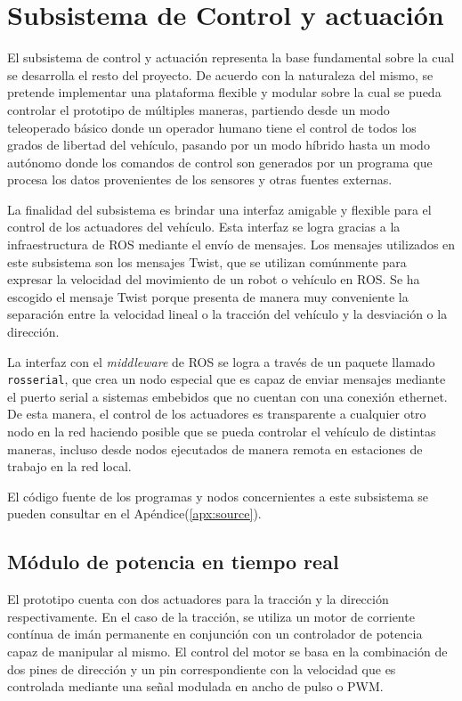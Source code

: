 \section{Subsistema de Control y actuación}\label{sec:control}

El subsistema de control y actuación representa la base fundamental sobre la cual se desarrolla el resto del proyecto. De acuerdo 
con la naturaleza del mismo, se pretende implementar una plataforma flexible y modular sobre la cual se pueda controlar el 
prototipo de múltiples maneras, partiendo desde un modo teleoperado básico donde un operador humano tiene el control 
de todos los grados de libertad del vehículo, pasando por un modo híbrido hasta un modo autónomo donde los comandos de 
control son generados por un programa que procesa los datos provenientes de los sensores y otras fuentes externas.

La finalidad del subsistema es brindar una interfaz amigable y flexible para el control de los actuadores del vehículo. Esta 
interfaz se logra gracias a la infraestructura de ROS mediante el envío de mensajes. Los mensajes utilizados en este subsistema 
son los mensajes Twist, que se utilizan comúnmente para expresar la velocidad del movimiento de un robot o vehículo en ROS. Se ha
escogido el mensaje Twist porque presenta de manera muy conveniente la separación entre la velocidad lineal o 
la tracción del vehículo y la desviación o la dirección. 

La interfaz con el \textit{middleware} de ROS se logra a través de un paquete llamado \lstinline{rosserial}, que crea un nodo especial 
que es capaz de enviar mensajes mediante el puerto serial a sistemas embebidos que no cuentan con una conexión ethernet. De esta 
manera, el control de los actuadores es transparente a cualquier otro nodo en la red haciendo posible que se pueda controlar 
el vehículo de distintas maneras, incluso desde nodos ejecutados de manera remota en estaciones de trabajo en la red local.

El código fuente de los programas y nodos concernientes a este subsistema se pueden consultar en el Apéndice(\ref{apx:source}).


    \subsection{Módulo de potencia en tiempo real}
    El prototipo cuenta con dos actuadores para la tracción y la dirección respectivamente. En el caso de la tracción, se 
    utiliza un motor de corriente contínua de imán permanente en conjunción con un controlador de potencia capaz de manipular 
    al mismo. El control del motor se basa en la combinación de dos pines de dirección y un pin correspondiente con la velocidad 
    que es controlada mediante una señal modulada en ancho de pulso o PWM. 

